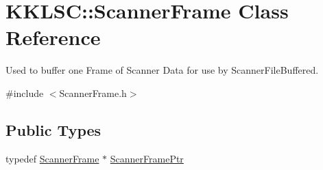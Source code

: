 \hypertarget{class_k_k_l_s_c_1_1_scanner_frame}{}\section{K\+K\+L\+SC\+:\+:Scanner\+Frame Class Reference}
\label{class_k_k_l_s_c_1_1_scanner_frame}


Used to buffer one Frame of Scanner Data for use by \textquotesingle{}Scanner\+File\+Buffered\textquotesingle{}.  




{\ttfamily \#include $<$Scanner\+Frame.\+h$>$}

\subsection*{Public Types}
\begin{DoxyCompactItemize}
\item 
typedef \hyperlink{class_k_k_l_s_c_1_1_scanner_frame}{Scanner\+Frame} $\ast$ \hyperlink{class_k_k_l_s_c_1_1_scanner_frame_a1f74e8ccdefff626991fd1d68ff00362}{Scanner\+Frame\+Ptr}
\end{DoxyCompactItemize}
